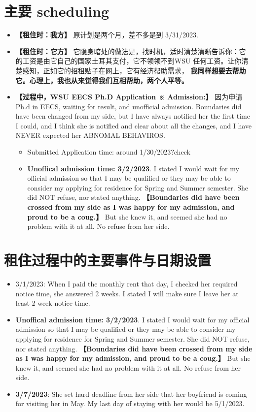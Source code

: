 \documentclass[9pt, b5paper]{article}
\begin{document}
\section{主要 scheduling}
\label{sec-3}
\begin{itemize}
\item \textbf{【租住时：我方】} 原计划是两个月，差不多是到 3/31/2023.
\item \textbf{【租住时：它方】} 它隐身暗处的做法是，找时机，适时清楚清晰告诉你：它的工资是由它自己的国家土耳其支付，它不领领不到WSU 任何工资。让你清楚感知，正如它的招租贴子在网上，它有经济帮助需求， \textbf{我同样想要去帮助它。心理上，我也从来觉得我们互相帮助，两个人平等。}
\item \textbf{【过程中，WSU EECS Ph.D Application ※ Admission:】} 因为申请Ph.d in EECS, waiting for result, and unofficial admission. Boundaries did have been changed from my side, but I have always notified her the first time I could, and I think she is notified and clear about all the changes, and I have NEVER expected her ABNOMAL BEHAVIROS. 
\begin{itemize}
\item Submitted Application time: around 1/30/2023?check
\item \textbf{Unoffical admission time: 3/2/2023}. I stated I would wait for my official admission so that I may be qualified or they may be able to consider my applying for residence for Spring and Summer semester. She did NOT refuse, nor stated anything. \textbf{【Boundaries did have been crossed from my side as I was happy for my admission, and proud to be a coug.】}  But she knew it, and seemed she had no problem with it at all. No refuse from her side.
\end{itemize}
\end{itemize}

\section{租住过程中的主要事件与日期设置}
\label{sec-4}
\begin{itemize}
\item 3/1/2023: When I paid the monthly rent that day, I checked her required notice time, she answered 2 weeks. I stated I will make sure I leave her at least 2 week notice time.
\item \textbf{Unoffical admission time: 3/2/2023}. I stated I would wait for my official admission so that I may be qualified or they may be able to consider my applying for residence for Spring and Summer semester. She did NOT refuse, nor stated anything. \textbf{【Boundaries did have been crossed from my side as I was happy for my admission, and proud to be a coug.】} But she knew it, and seemed she had no problem with it at all. No refuse from her side.
\item \textbf{3/7/2023}: She set hard deadline from her side that her boyfriend is coming for visiting her in May. My last day of staying with her would be 5/1/2023.
\end{itemize}
\end{document}
